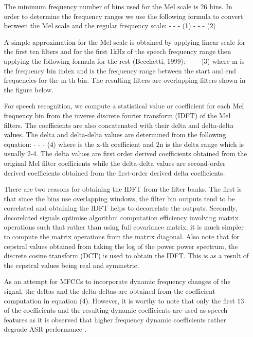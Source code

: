 The minimum frequency number of bins used for the Mel scale is 26 bins. In order to determine the frequency ranges we use the following formula to convert between the Mel scale and the regular frequency scale:
 - - - (1)
 - - - (2)

A simple approximation for the Mel scale is obtained by applying linear scale for the first ten filters and for the first 1kHz of the speech frequency range then applying the following formula for the rest (Becchetti, 1999)\citep{becchetti1999behaviour}:
 - - - (3)
where m is the frequency bin index and  is the frequency range between the start and end frequencies for the m-th bin. The resulting filters are overlapping filters shown in the figure below.


For speech recognition, we compute a statistical value or coefficient for each Mel frequency bin from the inverse discrete fourier transform (IDFT) of the Mel filters.  The coefficients are also concatenated with their delta and delta-delta values.  The delta and delta-delta values are determined from the following equation:
 - - - (4)
where  is the x-th coefficient and 2n is the delta range which is usually 2-4. The delta values are first order derived coefficients obtained from the original Mel filter coefficients while the delta-delta values are second-order derived coefficients obtained from the first-order derived delta coefficients.

There are two reasons for obtaining the IDFT from the filter banks.  The first is that since the bins use overlapping windows, the filter bin outputs tend to be correlated and obtaining the IDFT helps to decorrelate the outputs.  Secondly, decorelated signals optimise algorithm computation efficiency involving matrix operations such that rather than using full covariance matrix, it is much simpler to compute the matrix operations from the matrix diagonal.  Also note that for cepstral values obtained from taking the log of the power power spectrum, the discrete cosine transform (DCT) is used to obtain the IDFT.  This is as a result of the cepstral values being real and symmetric\citep{gales2008application}.

As an attempt for MFCCs to incorporate dynamic frequency changes of the signal, the deltas and the delta-deltas are obtained from the coefficient computation in equation (4).  However, it is worthy to note that only the first 13 of the coefficients and the resulting dynamic coefficients are used as speech features as it is observed that higher frequency dynamic coefficients rather degrade ASR performance \citep{gales2008application}.
 

